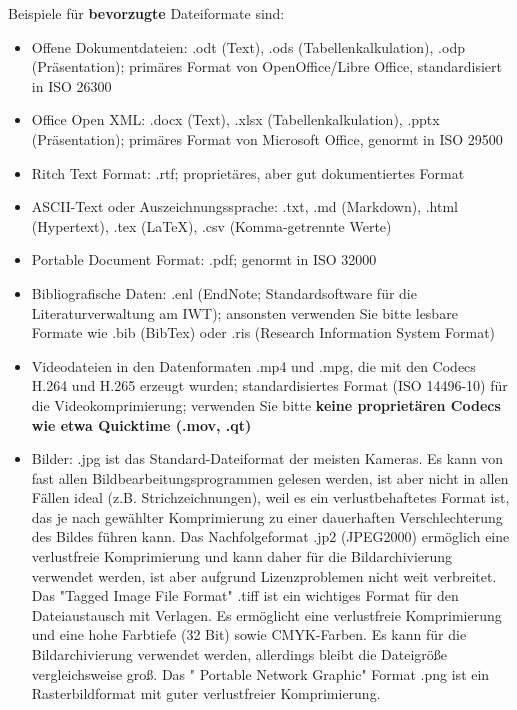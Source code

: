 \noindent Beispiele für \textbf{bevorzugte} Dateiformate sind:
\begin{itemize}
  \item Offene Dokumentdateien: .odt (Text), .ods (Tabellenkalkulation), .odp
        (Präsentation); primäres Format von OpenOffice/Libre Office,
        standardisiert in ISO 26300
  \item Office Open XML: .docx (Text), .xlsx (Tabellenkalkulation), .pptx
        (Präsentation); primäres Format von Microsoft Office, genormt in ISO 29500
  \item Ritch Text Format: .rtf; proprietäres, aber gut dokumentiertes Format
  \item ASCII-Text oder Auszeichnungssprache: .txt, .md (Markdown), .html
        (Hypertext), .tex (LaTeX), .csv (Komma-getrennte Werte)
  \item Portable Document Format: .pdf; genormt in ISO 32000
  \item Bibliografische Daten: .enl (EndNote; Standardsoftware für die
        Literaturverwaltung am IWT); ansonsten verwenden Sie bitte lesbare
        Formate wie .bib (BibTex) oder .ris (Research Information System Format)
  \item Videodateien in den Datenformaten .mp4 und .mpg, die mit den Codecs
        H.264 und H.265 erzeugt wurden; standardisiertes Format (ISO 14496-10)
        für die Videokomprimierung; verwenden Sie bitte \textbf{keine
        proprietären Codecs wie etwa Quicktime (.mov, .qt)}
  \item Bilder: .jpg ist das Standard-Dateiformat der meisten Kameras. Es kann
        von fast allen Bildbearbeitungsprogrammen gelesen werden, ist aber nicht
        in allen Fällen ideal (z.B. Strichzeichnungen), weil es ein
        verlustbehaftetes Format ist, das je nach gewählter Komprimierung zu
        einer dauerhaften Verschlechterung des Bildes führen kann. Das
        Nachfolgeformat .jp2 (JPEG2000) ermöglich eine verlustfreie
        Komprimierung und kann daher für die Bildarchivierung verwendet werden,
        ist aber aufgrund Lizenzproblemen nicht weit verbreitet. Das
        "Tagged Image File Format" .tiff ist ein wichtiges Format für den
        Dateiaustausch mit Verlagen. Es ermöglicht eine verlustfreie
        Komprimierung und eine hohe Farbtiefe (32 Bit) sowie CMYK-Farben.
        Es kann für die Bildarchivierung verwendet werden, allerdings bleibt die
        Dateigröße vergleichsweise groß. Das " Portable Network Graphic" Format
        .png ist ein Rasterbildformat mit guter verlustfreier Komprimierung.

\end{itemize}
